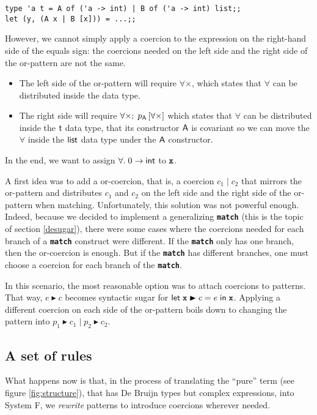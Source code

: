\documentclass[10pt,a4paper,twoside,titlepage,twocolumn]{article}
\newcommand{\code}[1]{\textbf{\texttt{#1}}}
\begin{document}
\begin{verbatim}
type 'a t = A of ('a -> int) | B of ('a -> int) list;;
let (y, (A x | B [x])) = ...;;
\end{verbatim}

However, we cannot simply apply a coercion to the expression on the right-hand
side of the equals sign: the coercions needed on the left side and the right
side of the or-pattern are not the same.
\begin{itemize}
  \item The left side of the or-pattern will require $\forall\times$, which states
    that $\forall$ can be distributed inside the data type.
  \item The right side will require
    $\forall\times;\;p_{\text{\textsf{A}}}\left[ \forall\times \right]$
    which states
    that $\forall$ can be distributed inside the $\text{\textsf{t}}$ data type, that its
    constructor $\text{\textsf{A}}$ is covariant so we can move the $\forall$ inside the
    $\text{\textsf{list}}$ data type under the $\text{\textsf{A}}$ constructor.
\end{itemize}
In the end, we want to assign $\forall.\;0\to\text{\textsf{int}}$ to $\evid$.

A first idea was to add a or-coercion, that is, a coercion $c_1\;|\;c_2$ that
mirrors the or-pattern and distributes $c_1$ and $c_2$ on the left side and the
right side of the or-pattern when matching. Unfortunately, this solution was not
powerful enough. Indeed, because we decided to implement a generalizing
\code{match} (this is the topic of section \vref{desugar}), there were some
cases where the coercions needed for each branch of a \code{match} construct
were different. If the \code{match} only has one branch, then the or-coercion is
enough. But if the \code{match} has different branches, one must choose a
coercion for each branch of the \code{match}.

In this scenario, the most reasonable option was to attach coercions to
patterns. That way, $e \blacktriangleright c$ becomes syntactic sugar for
$\kwd{let}\; \evid \blacktriangleright c = e\;\kwd{in}\; \evid$. Applying a
different coercion on each side of the or-pattern boils down to changing the
pattern into $p_1 \blacktriangleright c_1\;|\; p_2 \blacktriangleright c_2$.

\subsection{A set of rules}

What happens now is that, in the process of translating the ``pure'' term (see
figure \vref{fig:structure}), that has De Bruijn types but complex expressions,
into System F, we \emph{rewrite} patterns to introduce coercions wherever needed.
\end{document}
